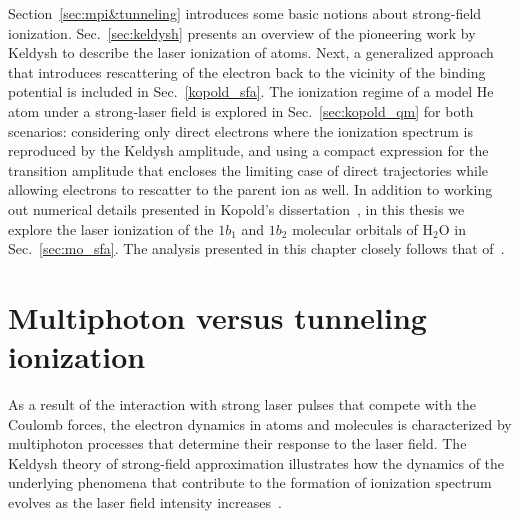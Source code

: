 Section~\ref{sec:mpi&tunneling} introduces some basic notions about
strong-field ionization. Sec.~\ref{sec:keldysh} presents an overview
of the pioneering work by Keldysh to describe the laser ionization of
atoms. Next, a generalized approach that introduces rescattering of
the electron back to the vicinity of the binding potential is included
in Sec.~\ref{kopold_sfa}. The ionization regime of a model He atom
under a strong-laser field is explored in Sec.~\ref{sec:kopold_qm} for
both scenarios: considering only direct electrons where the ionization
spectrum is reproduced by the Keldysh amplitude, and using a compact
expression for the transition amplitude that encloses the limiting
case of direct trajectories while allowing electrons to rescatter to
the parent ion as well. In addition to working out numerical details
presented in Kopold's dissertation~\cite{phd_Kopold}, in this thesis
we explore the laser ionization of the $1b_{1}$ and $1b_{2}$ molecular
orbitals of H$_{2}$O in Sec.~\ref{sec:mo_sfa}. The analysis presented
in this chapter closely follows that of~\cite{Kopold_1997sfa}.




\section{\label{sec:mpi&tunneling} Multiphoton versus tunneling ionization}

As a result of the interaction with strong laser pulses that compete
with the Coulomb forces, the electron dynamics in atoms and molecules
is characterized by multiphoton processes that determine their
response to the laser field. The Keldysh theory of strong-field
approximation illustrates how the dynamics of the underlying phenomena
that contribute to the formation of ionization spectrum evolves as the
laser field intensity increases~\cite{KeldyshSFA}.

